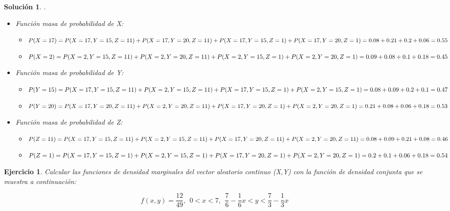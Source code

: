 \documentclass[11pt, a4paper]{article}
\newif\IfInSansMode
\theoremstyle{theorem-style}
\theoremstyle{definition-style}
\newtheorem{ejer}{Ejercicio}[section]
\theoremstyle{remark-style}
\newtheorem*{sol}{Solución}
\theoremstyle{example-style}
\begin{document}
\begin{sol}.
	\\
\begin{itemize}
	\item Función masa de probabilidad de X: \\
	\begin{itemize}
	\item $ P(X=17) = P(X=17,Y=15,Z=11)+P(X=17,Y=20,Z=11) \\ +P(X=17,Y=15,Z=1)+P(X=17,Y=20,Z=1)=0.08+0.21+0.2+0.06=0.55$ 
	\item $ P(X = 2) = P(X=2,Y=15,Z=11)+P(X=2,Y=20,Z=11) \\ +P(X=2,Y=15,Z=1)+P(X=2,Y=20,Z=1)=0.09+0.08+0.1+0.18=0.45$
	\end{itemize}

	\item Función masa de probabilidad de Y: \\
	\begin{itemize}
		\item $ P(Y=15) = P(X=17,Y=15,Z=11)+P(X=2,Y=15,Z=11) \\ +P(X=17,Y=15,Z=1)+P(X=2,Y=15,Z=1)=0.08+0.09+0.2+0.1=0.47$ 
		\item $ P(Y = 20) = P(X=17,Y=20,Z=11)+P(X=2,Y=20,Z=11) \\ +P(X=17,Y=20,Z=1)+P(X=2,Y=20,Z=1)=0.21+0.08+0.06+0.18=0.53$
	\end{itemize}
	
	\item Función masa de probabilidad de Z: \\
	\begin{itemize}
		\item $ P(Z=11) = P(X=17,Y=15,Z=11)+P(X=2,Y=15,Z=11) \\ +P(X=17,Y=20,Z=11)+P(X=2,Y=20,Z=11)=0.08+0.09+0.21+0.08=0.46$ 
		\item $ P(Z=1) = P(X=17,Y=15,Z=1)+P(X=2,Y=15,Z=1) \\ +P(X=17,Y=20,Z=1)+P(X=2,Y=20,Z=1)=0.2+0.1+0.06+0.18=0.54\\ \\ $
	\end{itemize}
\end{itemize}
	
\end{sol}

\begin{ejer}
	Calcular las funciones de densidad marginales del vector aleatorio continuo (X,Y) con la función de densidad conjunta
	que se muestra a continuación:
	
	$$ f(x,y)= \frac{12}{49}, \ \ 0 < x < 7, \ \ \frac{7}{6}-\frac{1}{6}x < y < \frac{7}{3}-\frac{1}{3}x$$
\end{ejer}
\end{document}
